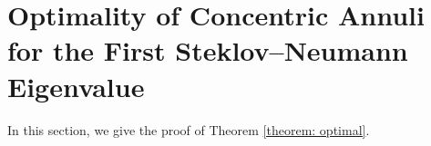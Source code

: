 \documentclass[12pt,reqno]{amsart}
\numberwithin{equation}{section}
\numberwithin{theorem}{section}
\numberwithin{equation}{section}
\numberwithin{theorem}{section}
\begin{document}


\section{Optimality of Concentric Annuli for the First Steklov--Neumann Eigenvalue}

 In this section, we give the proof of Theorem \ref{theorem: optimal}.
\end{document}
